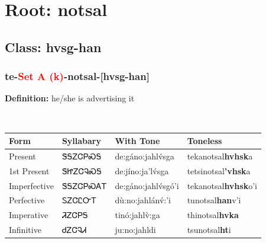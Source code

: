 \needspace{4in}
\section*{Root: notsal}
\nopagebreak
{}
\needspace{3in}
\subsection*{Class: hvsg-han}
\nopagebreak
\needspace{2in}
\subsubsection*{te{-}\textcolor{Red}{Set A (k)}{-}\textbf{notsal}{-}[hvsg-han]}
\nopagebreak
\textbf{Definition: } he/she is advertising it
\\[0.5em]
\begin{tabularx}{\textwidth}{l X X X}%
\toprule%
\textbf{Form}&\textbf{Syllabary}&\textbf{With Tone}&\textbf{Toneless}\\%
\midrule%
Present&ᏕᎦᏃᏣᏢᏍᎦ&de:gáno:jahlv́sga&tekanotsal\textbf{hvhsk}a\\%
1st Present&ᏕᏥᏃᏣᎸᏍᎦ&de:jíno:ja’lv́sga&tetsinotsal\textbf{'vhsk}a\\%
Imperfective&ᏕᎦᏃᏣᏢᏍᎪᎢ&de:gáno:jahlv́sgó’i&tekanotsal\textbf{hvhsk}o'i\\%
Perfective&ᏚᏃᏣᏝᏅᎢ&dù:no:jahlánv́:’i&tunotsal\textbf{han}v'i\\%
Imperative&ᏘᏃᏣᏢᎦ&tinó:jahlv̀:ga&thinotsal\textbf{hvka}\\%
Infinitive&ᏧᏃᏣᎸᏗ&ju:no:jahldi&tsunotsal\textbf{ht}i\\%
\bottomrule%
\end{tabularx}
\\[1em]